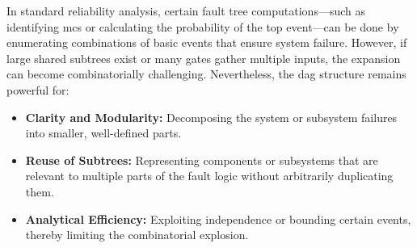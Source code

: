 In standard reliability analysis, certain fault tree computations—such as identifying \acrfull{mcs} or calculating the probability of the top event—can be done by enumerating combinations of basic events that ensure system failure. However, if large shared subtrees exist or many gates gather multiple inputs, the expansion can become combinatorially challenging. Nevertheless, the \acrshort{dag} structure remains powerful for:

\begin{itemize}
\item \textbf{Clarity and Modularity:} Decomposing the system or subsystem failures into smaller, well-defined parts.  
\item \textbf{Reuse of Subtrees:} Representing components or subsystems that are relevant to multiple parts of the fault logic without arbitrarily duplicating them.  
\item \textbf{Analytical Efficiency:} Exploiting independence or bounding certain events, thereby limiting the combinatorial explosion.  
\end{itemize}
